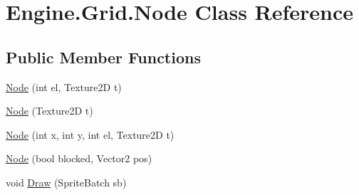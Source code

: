 \hypertarget{a00414}{}\section{Engine.\+Grid.\+Node Class Reference}
\label{a00414}
\subsection*{Public Member Functions}
\begin{DoxyCompactItemize}
\item 
\hyperlink{a00414_a85d060475bb7bbbe867139515056deab}{Node} (int el, Texture2D t)
\item 
\hyperlink{a00414_a80bf502a107001b9137f9ef9a1b2d6ca}{Node} (Texture2D t)
\item 
\hyperlink{a00414_a4f7ab4c1d61c23b8043d91cca3ca2179}{Node} (int x, int y, int el, Texture2D t)
\item 
\hyperlink{a00414_a001aadc1245a6c9f3506ffb96d6639ab}{Node} (bool blocked, Vector2 pos)
\item 
void \hyperlink{a00414_a2a8403b6a860db08260ee9a40f2f3e6e}{Draw} (Sprite\+Batch sb)
\end{DoxyCompactItemize}

